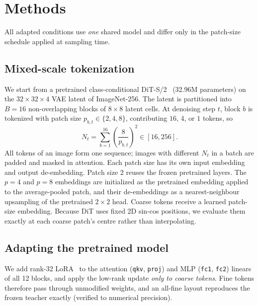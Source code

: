 \newcommand{\todo}[1]{\textcolor{red}{[\textbf{TODO:} #1]}}

\section{Methods}
\label{sec:methods}

All adapted conditions use \emph{one} shared model and differ only in the patch-size schedule applied at sampling time.

\subsection{Mixed-scale tokenization}
\label{sec:tokenization}
We start from a pretrained class-conditional DiT-S/2~\citep{peebles2023dit} (32.96M parameters) on the $32{\times}32{\times}4$
VAE latent of ImageNet-256. The latent is partitioned into $B{=}16$ non-overlapping blocks of $8{\times}8$ latent cells.
At denoising step $t$, block $b$ is tokenized with patch size $p_{b,t}\in\{2,4,8\}$, contributing $16$, $4$, or $1$ tokens, so
\begin{equation}
N_t=\sum_{b=1}^{16}\left(\frac{8}{p_{b,t}}\right)^2 \in [16, 256].
\label{eq:tokens}
\end{equation}
All tokens of an image form one sequence; images with different $N_t$ in a batch are padded and masked in attention.
Each patch size has its own input embedding and output de-embedding. Patch size 2 reuses the frozen pretrained layers.
The $p{=}4$ and $p{=}8$ embeddings are initialized as the pretrained embedding applied to the average-pooled patch, and their
de-embeddings as a nearest-neighbour upsampling of the pretrained $2{\times}2$ head. Coarse tokens receive a learned patch-size
embedding. Because DiT uses fixed 2D sin-cos positions, we evaluate them exactly at each coarse patch's centre rather than interpolating.

\subsection{Adapting the pretrained model}
\label{sec:adaptation}
We add rank-32 LoRA~\citep{hu2022lora} to the attention (\texttt{qkv}, \texttt{proj}) and MLP (\texttt{fc1}, \texttt{fc2}) linears of all
12 blocks, and apply the low-rank update \emph{only to coarse tokens}. Fine tokens therefore pass through unmodified weights, and an
all-fine layout reproduces the frozen teacher exactly (verified to numerical precision).


